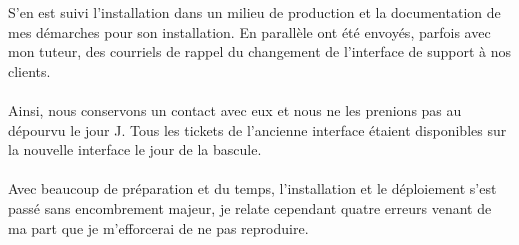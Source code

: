 \begin{sloppypar}
S'en est suivi l'installation dans un milieu de production et la documentation de mes démarches pour son installation. En parallèle ont été envoyés, parfois avec mon tuteur, des courriels de rappel du changement de l'interface de support à nos clients.
\\ \\
Ainsi, nous conservons un contact avec eux et nous ne les prenions pas au dépourvu le jour J. Tous les tickets de l'ancienne interface étaient disponibles sur la nouvelle interface le jour de la bascule.
\\ \\
Avec beaucoup de préparation et du temps, l'installation et le déploiement s'est passé sans encombrement majeur, je relate cependant quatre erreurs venant de ma part que je m'efforcerai de ne pas reproduire.


\end{sloppypar}
